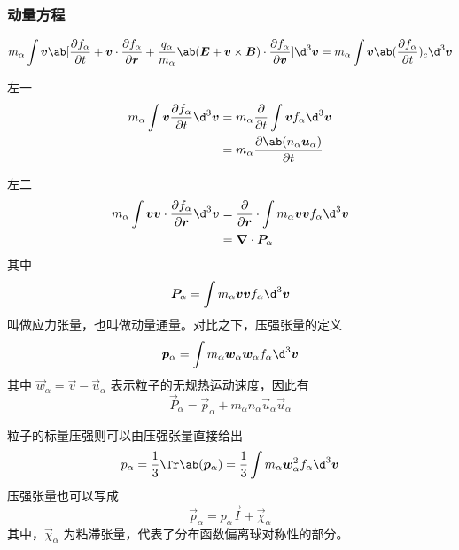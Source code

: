 \subsubsection{动量方程}

\begin{equation}
    m_\alpha \int \vec{v} \ab[
        \pdv{f_\alpha}{t} + \vec{v} \cdot \pdv{f_\alpha}{\vec{r}} + \frac{q_\alpha}{m_\alpha} \ab( \vec{E} + \vec{v} \times \vec{B} ) \cdot \pdv{f_\alpha}{\vec{v}}
    ] \d^3 \vec{v}
    = m_\alpha \int \vec{v} \ab( \pdv{f_\alpha}{t} )_c \d^3 \vec{v}
\end{equation}

左一
\begin{equation}\begin{aligned}
    m_\alpha \int \vec{v} \pdv{f_\alpha}{t} \d^3 \vec{v}
    &= m_\alpha \pdv{}{t} \int \vec{v} f_\alpha \d^3 \vec{v} \\
    &= m_\alpha \pdv{\ab( n_\alpha \vec{u}_\alpha )}{t}
\end{aligned}\end{equation}

左二
\begin{equation}\begin{aligned}
    m_\alpha \int \vec{v} \vec{v} \cdot \pdv{f_\alpha}{\vec{r}} \d^3 \vec{v}
    &= \pdv{}{\vec{r}} \cdot \int m_\alpha \vec{v} \vec{v} f_\alpha \d^3 \vec{v} \\
    &= \dive{\vec{P}_\alpha}
\end{aligned}\end{equation}
其中
\begin{equation}
    \vec{P}_\alpha = \int m_\alpha \vec{v} \vec{v} f_\alpha \d^3 \vec{v}
\end{equation}
叫做应力张量，也叫做动量通量。对比之下，压强张量的定义
\begin{equation}
    \vec{p}_\alpha = \int m_\alpha \vec{w}_\alpha \vec{w}_\alpha f_\alpha \d^3 \vec{v}
\end{equation}
其中 $\vec{w}_\alpha = \vec{v} - \vec{u}_\alpha$ 表示粒子的无规热运动速度，因此有
\begin{equation}
    \vec{P}_\alpha = \vec{p}_\alpha + m_\alpha n_\alpha \vec{u}_\alpha \vec{u}_\alpha
\end{equation}

粒子的标量压强则可以由压强张量直接给出
\begin{equation}
    p_\alpha = \frac{1}{3} \Tr\ab(\vec{p}_\alpha)
    = \frac{1}{3} \int m_\alpha \vec{w}_\alpha^2 f_\alpha \d^3 \vec{v}
\end{equation}
压强张量也可以写成
\begin{equation}
    \vec{p}_\alpha = p_\alpha \vec{I} + \vec{\chi}_\alpha
\end{equation}
其中，$\vec{\chi}_\alpha$ 为粘滞张量，代表了分布函数偏离球对称性的部分。

